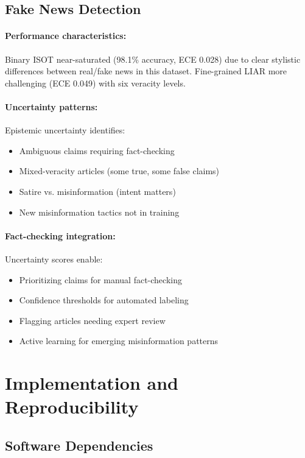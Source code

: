 \documentclass[12pt,a4paper]{article}
\theoremstyle{definition}
\begin{document}
\subsection{Fake News Detection}

\paragraph{Performance characteristics:}
Binary ISOT near-saturated (98.1\% accuracy, ECE 0.028) due to clear stylistic differences between real/fake news in this dataset. Fine-grained LIAR more challenging (ECE 0.049) with six veracity levels.

\paragraph{Uncertainty patterns:}
Epistemic uncertainty identifies:
\begin{itemize}
\item Ambiguous claims requiring fact-checking
\item Mixed-veracity articles (some true, some false claims)
\item Satire vs. misinformation (intent matters)
\item New misinformation tactics not in training
\end{itemize}

\paragraph{Fact-checking integration:}
Uncertainty scores enable:
\begin{itemize}
\item Prioritizing claims for manual fact-checking
\item Confidence thresholds for automated labeling
\item Flagging articles needing expert review
\item Active learning for emerging misinformation patterns
\end{itemize}

\section{Implementation and Reproducibility}
\label{app:implementation}

\subsection{Software Dependencies}
\end{document}
